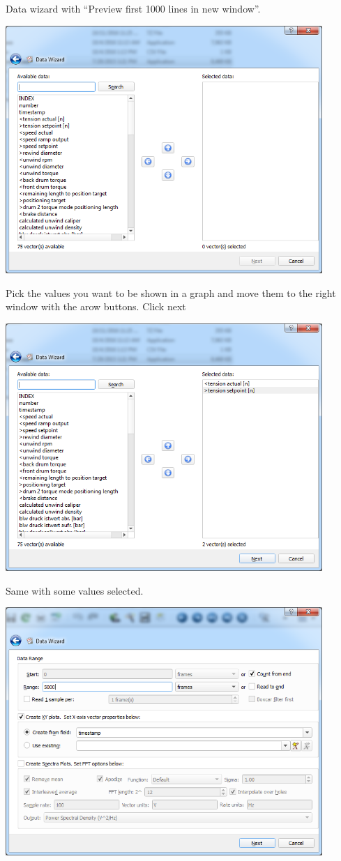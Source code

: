 \documentclass[a4paper,10pt,english]{sphinxmanual}
\begin{document}
Data wizard with  ``Preview first 1000 lines in new window''.

{\hfill\includegraphics[width=12cm]{wiz4.png}\hfill}

Pick the values you want to be shown in a graph and move them to the right window with the arow buttons. Click next

{\hfill\includegraphics[width=12cm]{wiz5.png}\hfill}

Same with some values selected.

{\hfill\includegraphics[width=12cm]{wiz6.png}\hfill}
\end{document}
